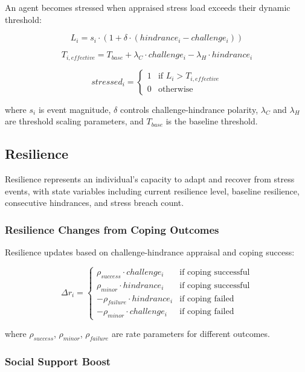 \documentclass[
  letterpaper,
  DIV=11,
  numbers=noendperiod]{scrartcl}
\begin{document}
An agent becomes stressed when appraised stress load exceeds their
dynamic threshold:

\[L_i = s_i \cdot (1 + \delta \cdot (hindrance_i - challenge_i))\]

\[T_{i,effective} = T_{base} + \lambda_C \cdot challenge_i - \lambda_H \cdot hindrance_i\]

\[stressed_i = \begin{cases} 1 & \text{if } L_i > T_{i,effective} \\ 0 & \text{otherwise} \end{cases}\]

where \(s_i\) is event magnitude, \(\delta\) controls
challenge-hindrance polarity, \(\lambda_C\) and \(\lambda_H\) are
threshold scaling parameters, and \(T_{base}\) is the baseline
threshold.

\subsection{Resilience}\label{resilience}

Resilience represents an individual's capacity to adapt and recover from
stress events, with state variables including current resilience level,
baseline resilience, consecutive hindrances, and stress breach count.

\subsubsection{Resilience Changes from Coping
Outcomes}\label{resilience-changes-from-coping-outcomes}

Resilience updates based on challenge-hindrance appraisal and coping
success:

\[\Delta r_i = \begin{cases}
\rho_{success} \cdot challenge_i & \text{if coping successful} \\
\rho_{minor} \cdot hindrance_i & \text{if coping successful} \\
-\rho_{failure} \cdot hindrance_i & \text{if coping failed} \\
-\rho_{minor} \cdot challenge_i & \text{if coping failed}
\end{cases}\]

where \(\rho_{success}\), \(\rho_{minor}\), \(\rho_{failure}\) are rate
parameters for different outcomes.

\subsubsection{Social Support Boost}\label{social-support-boost}
\end{document}

